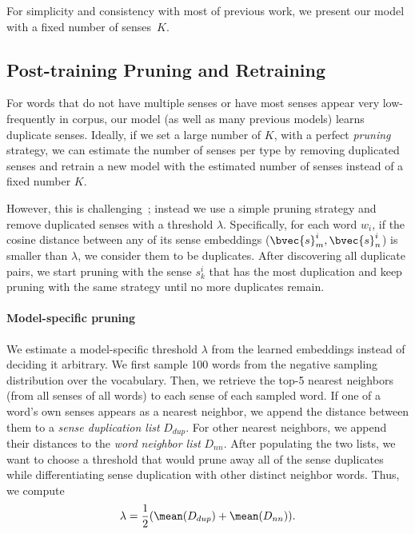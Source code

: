 For simplicity and consistency with most of previous work, we present
our model with a fixed number of senses~$K$.




\subsection{Post-training Pruning and Retraining}
\label{subsec:pruning}
For words that do not have multiple senses or have most senses appear
very low-frequently in corpus, our model (as well as many previous
models) learns duplicate senses.  Ideally, if we set a large number of $K$, with a perfect
\emph{pruning} strategy, we can estimate the number of senses per type by removing
duplicated senses and retrain a new model with the estimated number of senses instead 
of a fixed number $K$.

 However, this is challenging~\cite{mccarthy-16}; 
instead we use a simple pruning strategy and remove duplicated senses with a threshold
$\lambda$. Specifically, for each word $w_i$, if the cosine distance
between any of its sense embeddings ($\bvec{s}_{m}^i, \bvec{s}_{n}^i$)
is smaller than $\lambda$, we consider them to be duplicates. After
discovering all duplicate pairs, we start pruning with the sense
$s_k^i$ that has the most duplication and keep pruning with the same
strategy until no more duplicates remain.


\paragraph{Model-specific pruning}

We estimate a model-specific threshold $\lambda$ from the learned
embeddings instead of deciding it arbitrary. We first sample 100 words
from the negative sampling distribution over the vocabulary. Then, we
retrieve the top-5 nearest neighbors (from all senses of all words) to
each sense of each sampled word. If one of a word's own senses appears
as a nearest neighbor, we append the distance between them to a
\emph{sense duplication list} $D_{dup}$. For other nearest neighbors,
we append their distances to the \emph{word neighbor list}
$D_{nn}$. After populating the two lists, we want to choose a
threshold that would prune away all of the sense duplicates while
differentiating sense duplication with other distinct neighbor
words. Thus, we compute
\begin{equation}
\lambda = \frac{1}{2}(\mean(D_{dup}) + \mean(D_{nn})).
\end{equation}


